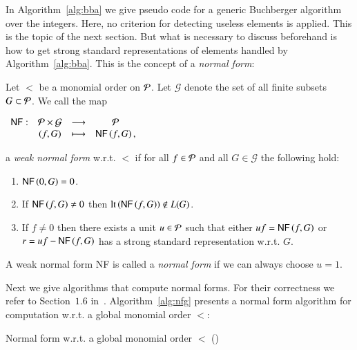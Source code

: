 In Algorithm~\ref{alg:bba} we give pseudo code for a generic Buchberger
algorithm over the integers. Here, no criterion for detecting useless elements
is applied. This is the topic of the next section. But what is necessary to
discuss beforehand is how to get strong standard representations of elements
handled by Algorithm~\ref{alg:bba}. This is the concept of a \emph{normal
form}:

\begin{definition}
Let $<$ be a monomial order on $\mathcal{P}$.
Let $\mathcal G$ denote the set of all finite subsets $G \subset \mathcal{P}$. We call
the map
\begin{center}
$
\begin{array}{rccc}
\text{\sffamily{NF}}: &\mathcal{P} \times \mathcal G &\longrightarrow& \mathcal{P}\\
                     & (f, G) &\longmapsto& \text{\sffamily{NF}}\left({f},{G}\right),
\end{array}
$
\end{center}
a \emph{weak normal form} w.r.t. $<$ if for all $f\in \mathcal{P}$ and all $G \in
\mathcal G$ the following hold:
\begin{enumerate}
\item $\text{\sffamily{NF}}\left({0},{G}\right) = 0$.
\item If $\text{\sffamily{NF}}\left({f},{G}\right) \neq 0$ then $\operatorname{lt}\left({\text{\sffamily{NF}}\left({f},{G}\right)}\right) \notin L(G)$.
\item If $f \neq 0$ then there exists a unit $u\in \mathcal{P}$ such that either
$uf = \text{\sffamily{NF}}\left({f},{G}\right)$ or
$r = uf - \text{\sffamily{NF}}\left({f},{G}\right)$ has a strong standard representation w.r.t. $G$.
\end{enumerate}
A weak normal form {\sffamily NF} is called a \emph{normal form} if we can always
choose $u=1$.
\end{definition}

Next we give algorithms that compute normal forms. For their correctness we
refer to Section~$1.6$ in~\cite{gpSingularBook2007}. Algorithm~\ref{alg:nfg}
presents a normal form algorithm for computation w.r.t. a global monomial order
$<$:

\begin{algorithm}
\caption{Normal form w.r.t. a global monomial order $<$
  (\nfn)} 
\label{alg:nfg}
\begin{algorithmic}[1]
\EndWhile
{}
\end{algorithmic}
\end{algorithm}

